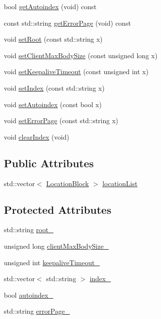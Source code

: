 \begin{DoxyCompactItemize}
bool \hyperlink{classft_1_1_base_directives_a4c11ed7ad76aeac228b029a2444de568}{get\+Autoindex} (void) const
\item 
const std\+::string \hyperlink{classft_1_1_base_directives_a3cb0c21f17781de392d5ee09d7190caf}{get\+Error\+Page} (void) const
\item 
void \hyperlink{classft_1_1_base_directives_a2a7990e309f7e38f2915dbbb0d2704cf}{set\+Root} (const std\+::string x)
\item 
void \hyperlink{classft_1_1_base_directives_a39bf4922f3236043c76beaffaa557a3b}{set\+Client\+Max\+Body\+Size} (const unsigned long x)
\item 
void \hyperlink{classft_1_1_base_directives_a0818b8529872ba9622329e2118d20c39}{set\+Keepalive\+Timeout} (const unsigned int x)
\item 
void \hyperlink{classft_1_1_base_directives_a6d3d8fd6eaaf71304128af6b3cee2a69}{set\+Index} (const std\+::string x)
\item 
void \hyperlink{classft_1_1_base_directives_ae7293c7bbf34e9bdc60c540dccd53342}{set\+Autoindex} (const bool x)
\item 
void \hyperlink{classft_1_1_base_directives_a505ecc88b3e1779583ad60cc243c7769}{set\+Error\+Page} (const std\+::string x)
\item 
void \hyperlink{classft_1_1_base_directives_a36d96dc74e650162c25a325813130ab2}{clear\+Index} (void)
\end{DoxyCompactItemize}
\subsection*{Public Attributes}
\begin{DoxyCompactItemize}
\item 
std\+::vector$<$ \hyperlink{classft_1_1_location_block}{Location\+Block} $>$ \hyperlink{classft_1_1_server_block_a225584d0d52d59571dd7ba84149901ce}{location\+List}
\end{DoxyCompactItemize}
\subsection*{Protected Attributes}
\begin{DoxyCompactItemize}
\item 
std\+::string \hyperlink{classft_1_1_base_directives_abb1eaf0bba10b90172d6152e69457dc7}{root\+\_\+}
\item 
unsigned long \hyperlink{classft_1_1_base_directives_ad65c2594d2a90ca065d410dfd4066a19}{client\+Max\+Body\+Size\+\_\+}
\item 
unsigned int \hyperlink{classft_1_1_base_directives_aa1f5f394b428d0d18765a9b9e14e648f}{keepalive\+Timeout\+\_\+}
\item 
std\+::vector$<$ std\+::string $>$ \hyperlink{classft_1_1_base_directives_a6ba30626837f300201cd32c35d50aa49}{index\+\_\+}
\item 
bool \hyperlink{classft_1_1_base_directives_a4ebffbe32f50a462afa139c6f03c1a4f}{autoindex\+\_\+}
\item 
std\+::string \hyperlink{classft_1_1_base_directives_a5c0d388109f086503961de84fe3fce90}{error\+Page\+\_\+}
\end{DoxyCompactItemize}
